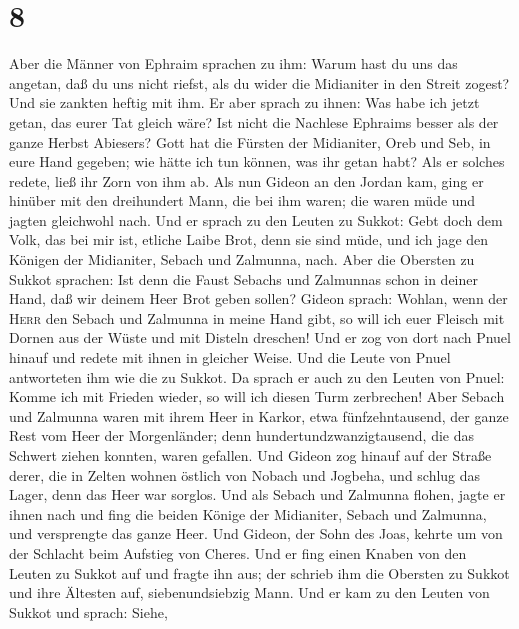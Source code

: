 \hypertarget{section-7}{%
\section{8}\label{section-7}}

 Aber die Männer von Ephraim sprachen zu ihm: Warum hast
du uns das angetan, daß du uns nicht riefst, als du wider die Midianiter
in den Streit zogest? Und sie zankten heftig mit ihm.  Er
aber sprach zu ihnen: Was habe ich jetzt getan, das eurer Tat gleich
wäre? Ist nicht die Nachlese Ephraims besser als der ganze Herbst
Abiesers?  Gott hat die Fürsten der Midianiter, Oreb und
Seb, in eure Hand gegeben; wie hätte ich tun können, was ihr getan habt?
Als er solches redete, ließ ihr Zorn von ihm ab.  Als nun
Gideon an den Jordan kam, ging er hinüber mit den dreihundert Mann, die
bei ihm waren; die waren müde und jagten gleichwohl nach. 
Und er sprach zu den Leuten zu Sukkot: Gebt doch dem Volk, das bei mir
ist, etliche Laibe Brot, denn sie sind müde, und ich jage den Königen
der Midianiter, Sebach und Zalmunna, nach.  Aber die
Obersten zu Sukkot sprachen: Ist denn die Faust Sebachs und Zalmunnas
schon in deiner Hand, daß wir deinem Heer Brot geben sollen?
 Gideon sprach: Wohlan, wenn der \textsc{Herr} den Sebach
und Zalmunna in meine Hand gibt, so will ich euer Fleisch mit Dornen aus
der Wüste und mit Disteln dreschen!  Und er zog von dort
nach Pnuel hinauf und redete mit ihnen in gleicher Weise. Und die Leute
von Pnuel antworteten ihm wie die zu Sukkot.  Da sprach er
auch zu den Leuten von Pnuel: Komme ich mit Frieden wieder, so will ich
diesen Turm zerbrechen!  Aber Sebach und Zalmunna waren
mit ihrem Heer in Karkor, etwa fünfzehntausend, der ganze Rest vom Heer
der Morgenländer; denn hundertundzwanzigtausend, die das Schwert ziehen
konnten, waren gefallen.  Und Gideon zog hinauf auf der
Straße derer, die in Zelten wohnen östlich von Nobach und Jogbeha, und
schlug das Lager, denn das Heer war sorglos.  Und als
Sebach und Zalmunna flohen, jagte er ihnen nach und fing die beiden
Könige der Midianiter, Sebach und Zalmunna, und versprengte das ganze
Heer.  Und Gideon, der Sohn des Joas, kehrte um von der
Schlacht beim Aufstieg von Cheres.  Und er fing einen
Knaben von den Leuten zu Sukkot auf und fragte ihn aus; der schrieb ihm
die Obersten zu Sukkot und ihre Ältesten auf, siebenundsiebzig Mann.
 Und er kam zu den Leuten von Sukkot und sprach: Siehe,

